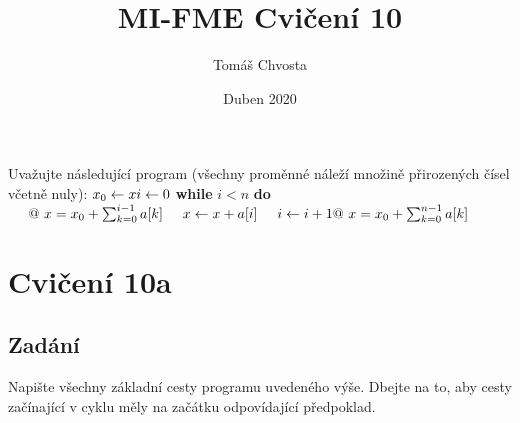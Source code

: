 \documentclass{article}
\title{MI-FME Cvičení 10}
\author{Tomáš Chvosta}
\date{Duben 2020}
\newcommand\tab[1][0.5cm]{\hspace*{#1}}
\begin{document}
\maketitle

Uvažujte následující program (všechny proměnné náleží množině přirozených čísel včetně nuly):
$\newline\newline x_0 \leftarrow x \newline i \leftarrow 0 \newline $ \textbf{while} $ i < n$ \textbf{do} $\newline \tab @\ x = x_0 + \sum_{k=0}^{i-1} a[k] \newline \tab x \leftarrow x + a[i] \newline \tab i \leftarrow i + 1 \newline @\ x = x_0 + \sum_{k=0}^{n-1} a[k]$

\section{Cvičení 10a}

\subsection{Zadání}
Napište všechny základní cesty programu uvedeného výše. Dbejte na to, aby cesty začínající v cyklu měly na začátku odpovídající předpoklad.
\end{document}
